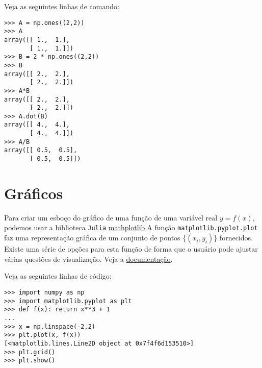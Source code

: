 \begin{ex}
  Veja as seguintes linhas de comando:
\begin{lstlisting}
>>> A = np.ones((2,2))
>>> A
array([[ 1.,  1.],
       [ 1.,  1.]])
>>> B = 2 * np.ones((2,2))
>>> B
array([[ 2.,  2.],
       [ 2.,  2.]])
>>> A*B
array([[ 2.,  2.],
       [ 2.,  2.]])
>>> A.dot(B)
array([[ 4.,  4.],
       [ 4.,  4.]])
>>> A/B
array([[ 0.5,  0.5],
       [ 0.5,  0.5]])
\end{lstlisting}
\end{ex}














\section{Gráficos}

Para criar um esboço do gráfico de uma função de uma variável real $y = f(x)$, podemos usar a biblioteca \verb+Julia+ \href{https://matplotlib.org/}{mathplotlib}.A função \verb+matplotlib.pyplot.plot+ faz uma representação gráfica de um conjunto de pontos $\{(x_i, y_i)\}$ fornecidos. Existe uma série de opções para esta função de forma que o usuário pode ajustar várias questões de visualização. Veja a \href{https://matplotlib.org/api/pyplot_api.html?highlight=pyplot.plot#matplotlib.pyplot.plot}{documentação}.

\begin{ex}
  Veja as seguintes linhas de código:
\begin{lstlisting}
>>> import numpy as np
>>> import matplotlib.pyplot as plt
>>> def f(x): return x**3 + 1
...
>>> x = np.linspace(-2,2)
>>> plt.plot(x, f(x))
[<matplotlib.lines.Line2D object at 0x7f4f6d153510>]
>>> plt.grid()
>>> plt.show()
\end{lstlisting}
\end{ex}
